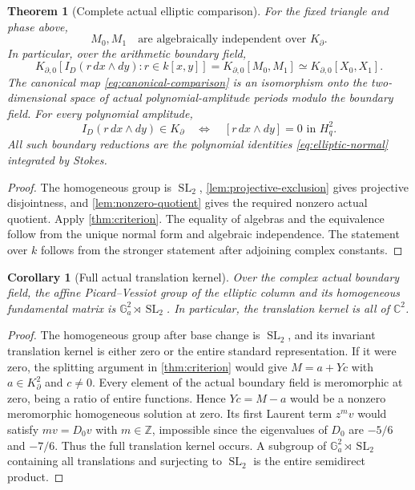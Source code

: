\documentclass[11pt]{article}
\numberwithin{equation}{section}
\newtheorem{theorem}{Theorem}[section]
\newtheorem{corollary}[corollary]{Corollary}
\theoremstyle{definition}
\theoremstyle{remark}
\newcommand{\Z}{\mathbb Z}
\newcommand{\SL}{\operatorname{SL}}
\newcommand{\Hq}{H_q^2}
\begin{document}
\begin{theorem}[Complete actual elliptic comparison]\label{thm:elliptic-main}
For the fixed triangle and phase above,
\[
 M_0,M_1\quad\text{are algebraically independent over }K_\partial.
\]
In particular, over the arithmetic boundary field,
\begin{equation}\label{eq:free-algebra}
 K_{\partial,0}[I_D(r\,dx\wedge dy):r\in k[x,y]]
 =K_{\partial,0}[M_0,M_1]\simeq K_{\partial,0}[X_0,X_1].
\end{equation}
The canonical map \eqref{eq:canonical-comparison} is an isomorphism onto the
two-dimensional space of actual polynomial-amplitude periods modulo the
boundary field. For every polynomial amplitude,
\begin{equation}\label{eq:linear-comparison}
 I_D(r\,dx\wedge dy)\in K_\partial
 \quad\Longleftrightarrow\quad
 [r\,dx\wedge dy]=0\text{ in }\Hq.
\end{equation}
All such boundary reductions are the polynomial identities
\eqref{eq:elliptic-normal} integrated by Stokes.
\end{theorem}
\begin{proof}
The homogeneous group is $\SL_2$,
\cref{lem:projective-exclusion} gives projective disjointness, and
\cref{lem:nonzero-quotient} gives the required nonzero actual quotient.
Apply \cref{thm:criterion}. The equality of algebras and the equivalence
follow from the unique normal form and algebraic independence. The
statement over $k$ follows from the stronger statement after adjoining
complex constants.
\end{proof}

\begin{corollary}[Full actual translation kernel]\label{cor:full-translation}
Over the complex actual boundary field, the affine Picard--Vessiot group
of the elliptic column and its homogeneous fundamental matrix is
$\mathbb G_a^2\rtimes\SL_2$. In particular, the translation kernel is
all of $\mathbb C^2$.
\end{corollary}
\begin{proof}
The homogeneous group after base change is $\SL_2$, and its invariant
translation kernel is either zero or the entire standard representation.
If it were zero, the splitting argument in \cref{thm:criterion} would give
$M=a+Yc$ with $a\in K_\partial^2$ and $c\ne0$. Every element of the
actual boundary field is meromorphic at zero, being a ratio of entire
functions. Hence $Yc=M-a$ would be a nonzero meromorphic homogeneous
solution at zero. Its first Laurent term $z^mv$ would satisfy
$m v=D_0v$ with $m\in\Z$, impossible since the eigenvalues of $D_0$
are $-5/6$ and $-7/6$. Thus the full translation kernel occurs. A subgroup
of $\mathbb G_a^2\rtimes\SL_2$ containing all translations and surjecting
to $\SL_2$ is the entire semidirect product.
\end{proof}
\end{document}
